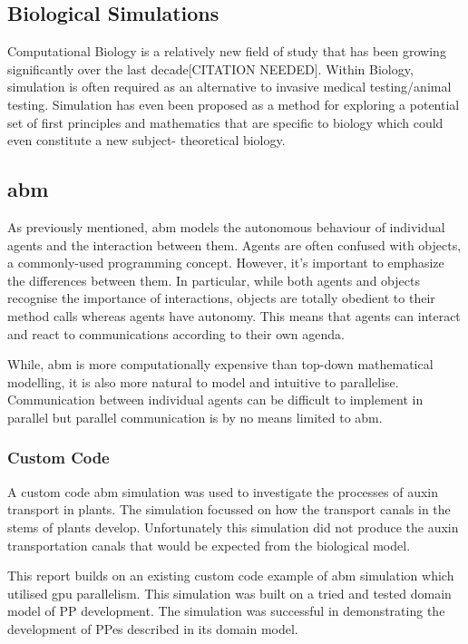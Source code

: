 \documentclass{UoYCSproject}
\begin{document}
\subsection{Biological Simulations}
Computational Biology is a relatively new field of study that has been growing significantly over the last decade[CITATION NEEDED].
Within Biology, simulation is often required as an alternative to invasive medical testing/animal testing.%
Simulation has even been proposed as a method for exploring a potential set of first principles and mathematics that are specific to biology which could even constitute a new subject- theoretical biology\cite{rise_article}.

\subsection{\acrlong{abm}}
\label{abm}
As previously mentioned, \gls{abm} models the autonomous behaviour of individual agents and the interaction between them.
Agents are often confused with objects, a commonly-used programming concept.
However, it's important to emphasize the differences between them.
In particular, while both agents and objects recognise the importance of interactions, objects are totally obedient to their method calls whereas agents have autonomy.
This means that agents can interact and react to communications according to their own agenda.

While, \acrlong{abm} is more computationally expensive than top-down mathematical modelling, it is also more natural to model and intuitive to parallelise\cite{flame_simulation}.
Communication between individual agents can be difficult to implement in parallel but parallel communication is by no means limited to \gls{abm}.

\subsubsection{Custom Code}
A custom code \gls{abm} simulation was used to investigate the processes of auxin transport in plants.\cite{stepney_abm}
The simulation focussed on how the transport canals in the stems of plants develop.
Unfortunately this simulation did not produce the auxin transportation canals that would be expected from the biological model.

This report builds on an existing custom code example of \gls{abm} simulation which utilised \gls{gpu} parallelism.\cite{phil_diss}
This simulation was built on a tried and tested domain model of \gls{PP} development\cite{kieran_thesis}.
The simulation was successful in demonstrating the development of \gls{PP}es described in its domain model.
\end{document}
